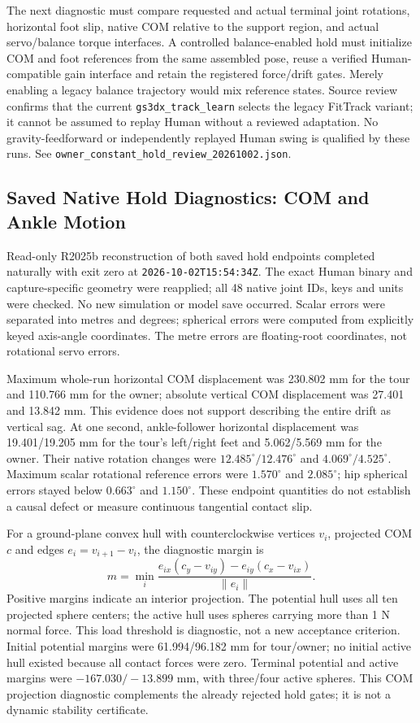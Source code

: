 \documentclass[11pt,a4paper]{article}
\begin{document}
The next diagnostic must compare requested and actual terminal joint
rotations, horizontal foot slip, native COM relative to the support region,
and actual servo/balance torque interfaces. A controlled balance-enabled
hold must initialize COM and foot references from the same assembled pose,
reuse a verified Human-compatible gain interface and retain the registered
force/drift gates. Merely enabling a legacy balance trajectory would mix
reference states. Source review confirms that the current
\texttt{gs3dx\_track\_learn} selects the legacy FitTrack variant; it
cannot be assumed to replay Human without a reviewed adaptation. No
gravity-feedforward or independently replayed Human swing is qualified by
these runs. See \texttt{owner\_constant\_hold\_review\_20261002.json}.


\subsection{Saved Native Hold Diagnostics: COM and Ankle Motion}
Read-only R2025b reconstruction of both saved hold endpoints completed
naturally with exit zero at \texttt{2026-10-02T15:54:34Z}. The exact Human
binary and capture-specific geometry were reapplied; all 48 native joint
IDs, keys and units were checked. No new simulation or model save occurred.
Scalar errors were separated into metres and degrees; spherical errors
were computed from explicitly keyed axis-angle coordinates. The metre
errors are floating-root coordinates, not rotational servo errors.

Maximum whole-run horizontal COM displacement was 230.802 mm for the tour
and 110.766 mm for the owner; absolute vertical COM displacement was
27.401 and 13.842 mm. This evidence does not support describing the entire
drift as vertical sag. At one second, ankle-follower horizontal displacement
was 19.401/19.205 mm for the tour's left/right feet and 5.062/5.569 mm for
the owner. Their native rotation changes were
$12.485^\circ/12.476^\circ$ and $4.069^\circ/4.525^\circ$.
Maximum scalar rotational reference errors were $1.570^\circ$ and
$2.085^\circ$; hip spherical errors stayed below $0.663^\circ$ and
$1.150^\circ$. These endpoint quantities do not establish a causal defect
or measure continuous tangential contact slip.

For a ground-plane convex hull with counterclockwise vertices $v_i$,
projected COM $c$ and edges $e_i=v_{i+1}-v_i$, the diagnostic margin is
\[
 m=\min_i\frac{e_{ix}(c_y-v_{iy})-e_{iy}(c_x-v_{ix})}{\lVert e_i\rVert}.
\]
Positive margins indicate an interior projection. The potential hull uses
all ten projected sphere centers; the active hull uses spheres carrying
more than 1 N normal force. This load threshold is diagnostic, not a new
acceptance criterion. Initial potential margins were 61.994/96.182 mm
for tour/owner; no initial active hull existed because all contact forces
were zero. Terminal potential and active margins were
$-167.030/-13.899$ mm, with three/four active spheres. This COM projection
diagnostic complements the already rejected hold gates; it is not a
dynamic stability certificate.
\end{document}
